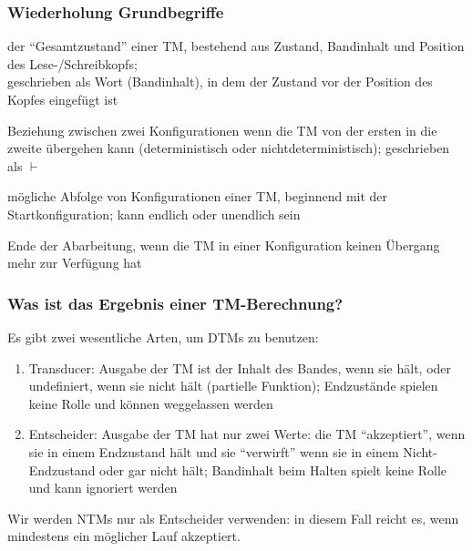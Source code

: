 \documentclass[onlymath]{beamer}
\begin{document}
\begin{frame}\frametitle{Wiederholung Grundbegriffe}

 der "`Gesamtzustand"' einer TM, bestehend aus Zustand, Bandinhalt und Position des Lese-/Schreibkopfs;\\[1ex]
geschrieben als Wort (Bandinhalt), in dem der Zustand vor der Position des Kopfes eingefügt ist
\bigskip

 Beziehung zwischen zwei Konfigurationen wenn die TM von der ersten in die zweite übergehen kann (deterministisch oder nichtdeterministisch); geschrieben als $\vdash$
\bigskip

 mögliche Abfolge von Konfigurationen einer TM, beginnend mit der Startkonfiguration; kann endlich oder unendlich sein
\bigskip

 Ende der Abarbeitung, wenn die TM in einer Konfiguration keinen Übergang mehr zur Verfügung hat

\end{frame}

\begin{frame}\frametitle{Was ist das Ergebnis einer TM-Berechnung?}

Es gibt zwei wesentliche Arten, um DTMs zu benutzen:

\begin{enumerate}[(1)]
\item \alert{Transducer:} Ausgabe der TM ist der Inhalt des Bandes, wenn sie hält, oder undefiniert, wenn sie nicht hält (partielle Funktion); Endzustände spielen keine Rolle und können weggelassen werden
\item \alert{Entscheider:} Ausgabe der TM hat nur zwei Werte: die TM "`akzeptiert"', wenn sie in einem Endzustand hält und sie "`verwirft"' wenn sie in einem Nicht-Endzustand oder gar nicht hält;
Bandinhalt beim Halten spielt keine Rolle und kann ignoriert werden
\end{enumerate}

Wir werden NTMs nur als Entscheider verwenden: in diesem Fall reicht es, wenn mindestens ein möglicher Lauf akzeptiert.

\end{frame}
\end{document}

